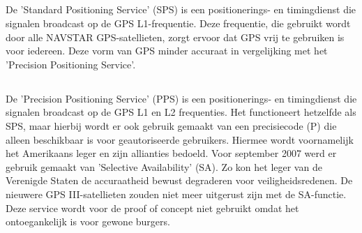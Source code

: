 \subsection{}
De 'Standard Positioning Service' (SPS) is een positionerings- en timingdienst die signalen broadcast op de GPS L1-frequentie. Deze frequentie, die gebruikt wordt door alle  \mbox{NAVSTAR} GPS-satellieten, zorgt ervoor dat GPS vrij te gebruiken is voor iedereen. \autocite{gps}
\newline
Deze vorm van GPS minder accuraat in vergelijking met het 'Precision Positioning Service'. 
\subsection{}
De 'Precision Positioning Service' (PPS) is een  positionerings- en timingdienst die signalen broadcast op de GPS L1 en L2 frequenties. Het functioneert hetzelfde als SPS, maar hierbij wordt er ook gebruik gemaakt van een precisiecode (P) die alleen beschikbaar is voor geautoriseerde gebruikers. Hiermee wordt voornamelijk het Amerikaans leger en zijn allianties bedoeld. \autocite{pps} Voor september 2007 werd er gebruik gemaakt van 'Selective Availability' (SA). Zo kon het leger van de Verenigde Staten de accuraatheid bewust degraderen voor veiligheidsredenen. De nieuwere GPS III-satellieten zouden niet meer uitgerust zijn met de SA-functie. 
\newline
Deze service wordt voor de proof of concept niet gebruikt omdat het  ontoegankelijk is voor gewone burgers.
